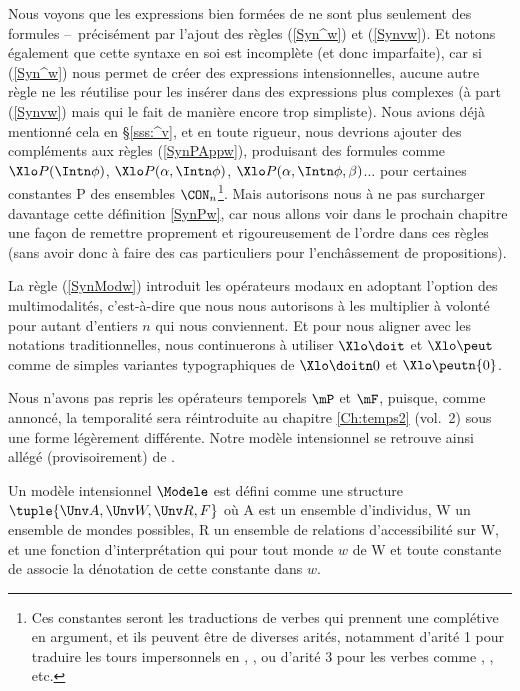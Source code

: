 Nous voyons que les expressions bien formées de {\LO} ne sont plus seulement des formules --~précisément par l'ajout des règles (\RSyn\ref{Syn^w}) et (\RSyn\ref{Synvw}). 
Et notons également que cette syntaxe en soi est incomplète (et donc imparfaite), car si (\RSyn\ref{Syn^w}) nous permet de créer des expressions intensionnelles, aucune autre règle ne les réutilise pour les insérer dans des expressions plus complexes (à part (\RSyn\ref{Synvw}) mais qui le fait de manière encore trop simpliste). 
Nous avions déjà mentionné cela en \S\ref{sss:^v}, et en toute rigueur, nous devrions ajouter des compléments aux règles (\RSyn\ref{SynPAppw}), produisant des formules comme $\Xlo P(\Intn\phi)$, $\Xlo P(\alpha,\Intn\phi)$, $\Xlo P(\alpha,\Intn\phi,\beta)$... pour certaines constantes \vrb P des ensembles $\CON_n$\footnote{Ces constantes seront les traductions de verbes qui prennent une complétive en argument, et ils peuvent être de diverses arités, notamment d'arité 1 pour traduire les tours impersonnels en , , ou d'arité 3 pour les verbes comme , , etc.}.
Mais autorisons nous à ne pas surcharger davantage cette définition \ref{SynPw}, car nous allons voir dans le prochain chapitre une façon de remettre proprement et rigoureusement de l'ordre dans ces règles (sans avoir donc à faire des cas particuliers pour l'enchâssement de propositions). 

La règle (\RSyn\ref{SynModw}) introduit les opérateurs modaux en adoptant l'option des multimodalités, c'est-à-dire que nous nous autorisons à les multiplier à volonté pour autant d'entiers $n$ qui nous conviennent. Et pour nous aligner avec les notations traditionnelles, nous continuerons à utiliser $\Xlo\doit$ et $\Xlo\peut$ comme de simples variantes typographiques de $\Xlo\doitn0$ et $\Xlo\peutn{0}$.

Nous n'avons pas repris les opérateurs temporels $\mP$ et $\mF$, puisque, comme annoncé, la temporalité sera réintroduite au chapitre \ref{Ch:temps2} (vol.~2) sous une forme légèrement différente.  Notre modèle intensionnel se retrouve ainsi allégé (provisoirement) de \Tps.


\begin{defi}
Un modèle intensionnel $\Modele$ est défini comme une structure \(\tuple{\Unv A,\Unv W, \Unv R,F}\) où \Unv A est un ensemble d'individus, \Unv W un ensemble de mondes possibles, \Unv R un ensemble de relations d'accessibilité sur \Unv W, et {\FI} une fonction d'interprétation qui pour tout monde $w$ de \Unv W et toute constante de {\CON} associe la dénotation de cette constante dans $w$.
\end{defi}


